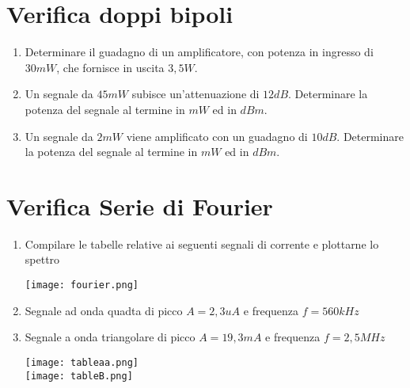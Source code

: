 \documentclass[fleqn]{exam}
\begin{document}
\section{Verifica doppi bipoli}
    \begin{enumerate}
        \item Determinare il guadagno di un amplificatore, con potenza in ingresso di $30 mW$, che fornisce in uscita $3,5 W$.
        \item Un segnale da $45 mW$ subisce un'attenuazione di $12 dB$. Determinare la potenza del segnale al termine in $mW$ ed in $dBm$.
        \item Un segnale da $2 mW$ viene amplificato con un guadagno di $10 dB$. Determinare la potenza del segnale al termine in $mW$ ed in $dBm$.
    \end{enumerate}

\pagebreak

\section{Verifica Serie di Fourier}
    \begin{enumerate}
        \item Compilare le tabelle relative ai seguenti segnali di corrente e plottarne lo spettro
    
    	\begin{center}
        \texttt{[image: fourier.png]}        
        \end{center}

        \item Segnale ad onda quadta di picco $A = 2,3 uA$ e frequenza $f = 560kHz$
        \item Segnale a onda triangolare di picco $A = 19,3 mA$ e frequenza $f = 2,5MHz$
        \begin{center}
        \texttt{[image: tableaa.png]}\\
        \texttt{[image: tableB.png]}\\
        \end{center}
    \end{enumerate}
\end{document}
